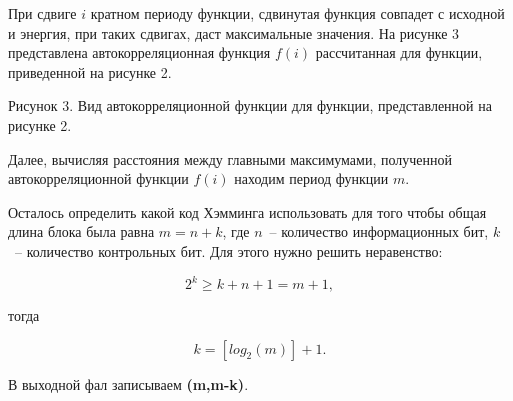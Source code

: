 При сдвиге $i$ кратном периоду функции, сдвинутая функция совпадет с исходной и энергия, при таких сдвигах, даст максимальные значения. На рисунке 3 представлена автокорреляционная функция $f(i)$ рассчитанная для функции, приведенной на рисунке 2.


\begin{center}
    Рисунок 3. Вид автокорреляционной функции для функции, представленной на рисунке 2.
\end{center}

Далее, вычисляя расстояния между главными максимумами, полученной автокорреляционной функции $f(i)$ находим период функции $m$.

Осталось определить какой код Хэмминга использовать для того чтобы общая длина блока была равна $m = n+k$, где $n$~– количество информационных бит, $k$~– количество контрольных бит. Для этого нужно решить неравенство:

$$2^k \geq k+n+1=m+1,$$

тогда 

$$k=[log_2(m)]+1.$$

В выходной фал записываем \textbf{(m,m-k)}.
